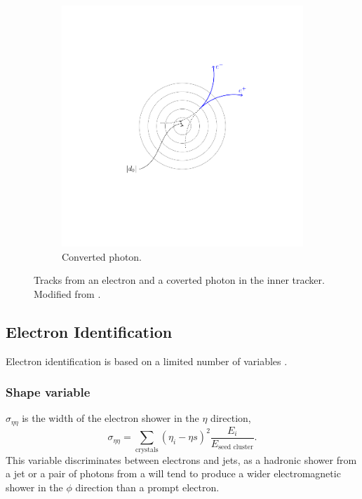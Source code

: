 \begin{figure}[htbp]
\begin{subfigure}{0.49\textwidth}
    \includegraphics[trim = 35mm 40mm 30mm 30mm, clip,width=\textwidth]{doca}
    \caption{Converted photon.}
    \label{fig:photon_path}
  \end{subfigure}
  \caption{Tracks from an electron and a coverted photon in the inner tracker. Modified from \cite{barge2009conversion}.}
  \label{fig:conversion}
\end{figure}


\subsection{Electron Identification}
Electron identification is based on a limited number of variables
\cite{daskalakis2009data,baffioni2009identification}.

\subsubsection{Shape variable}

$\sigma_{\eta\eta}$ is the width of the electron shower in the $\eta$
direction,
\begin{equation}
\sigma_{\eta\eta} = 
\sum_{\text{crystals}} \left(\eta_{i} - \eta{s}\right)^{2}
\frac{E_{i}}{E_{\text{seed cluster}}}.
\end{equation}
This variable discriminates between electrons and jets, as a hadronic
shower from a jet or a pair of photons from a \Ppizero will tend to produce a
wider electromagnetic shower in the $\phi$ direction than a prompt electron.

